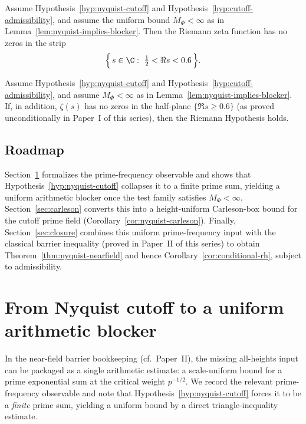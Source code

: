 \documentclass[11pt]{article}
\begin{document}
\begin{theorem}\label{thm:nyquist-nearfield}
Assume Hypothesis~\ref{hyp:nyquist-cutoff} and Hypothesis~\ref{hyp:cutoff-admissibility}, and assume the uniform bound $M_\Phi<\infty$ as in Lemma~\ref{lem:nyquist-implies-blocker}.
Then the Riemann zeta function has no zeros in the strip
\[
  \Bigl\{\,s\in\C:\ \tfrac12<\Re s<0.6\,\Bigr\}.
\]
\end{theorem}

\begin{corollary}\label{cor:conditional-rh}
Assume Hypothesis~\ref{hyp:nyquist-cutoff} and Hypothesis~\ref{hyp:cutoff-admissibility}, and assume $M_\Phi<\infty$ as in Lemma~\ref{lem:nyquist-implies-blocker}.
If, in addition, $\zeta(s)$ has no zeros in the half-plane $\{\Re s\ge 0.6\}$ (as proved unconditionally in Paper~I of this series),
then the Riemann Hypothesis holds.
\end{corollary}

\subsection*{Roadmap}
Section~\ref{sec:blocker} formalizes the prime-frequency observable and shows that Hypothesis~\ref{hyp:nyquist-cutoff} collapses it to a finite prime sum, yielding a uniform arithmetic blocker once the test family satisfies $M_\Phi<\infty$.
Section~\ref{sec:carleson} converts this into a height-uniform Carleson-box bound for the cutoff prime field (Corollary~\ref{cor:nyquist-carleson}).
Finally, Section~\ref{sec:closure} combines this uniform prime-frequency input with the classical barrier inequality (proved in Paper~II of this series) to obtain Theorem~\ref{thm:nyquist-nearfield} and hence Corollary~\ref{cor:conditional-rh}, subject to admissibility.

\section{From Nyquist cutoff to a uniform arithmetic blocker}\label{sec:blocker}

In the near-field barrier bookkeeping (cf.\ Paper~II), the missing all-heights input can be packaged as a single arithmetic estimate: a scale-uniform bound for a prime exponential sum at the critical weight $p^{-1/2}$.
We record the relevant prime-frequency observable and note that Hypothesis~\ref{hyp:nyquist-cutoff} forces it to be a \emph{finite} prime sum, yielding a uniform bound by a direct triangle-inequality estimate.
\end{document}
